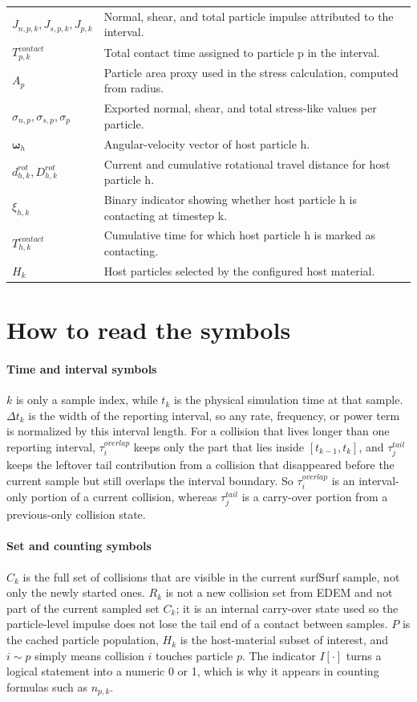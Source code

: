 \documentclass[11pt,a4paper]{article}
\begin{document}
\begin{longtable}{@{}L{0.22\textwidth}L{0.70\textwidth}@{}}
$J_{n,p,k}, J_{s,p,k}, J_{p,k}$ & Normal, shear, and total particle impulse attributed to the interval.\\
$T_{p,k}^{contact}$ & Total contact time assigned to particle p in the interval.\\
$A_p$ & Particle area proxy used in the stress calculation, computed from radius.\\
$\sigma_{n,p}, \sigma_{s,p}, \sigma_p$ & Exported normal, shear, and total stress-like values per particle.\\
$\boldsymbol{\omega}_h$ & Angular-velocity vector of host particle h.\\
$d_{h,k}^{rot}, D_{h,k}^{rot}$ & Current and cumulative rotational travel distance for host particle h.\\
$\xi_{h,k}$ & Binary indicator showing whether host particle h is contacting at timestep k.\\
$T_{h,k}^{contact}$ & Cumulative time for which host particle h is marked as contacting.\\
$H_k$ & Host particles selected by the configured host material.\\
\bottomrule
\end{longtable}

\section*{How to read the symbols}
\paragraph{Time and interval symbols}
$k$ is only a sample index, while $t_k$ is the physical simulation time at that sample.
$\Delta t_k$ is the width of the reporting interval, so any rate, frequency, or power term is normalized by this interval length.
For a collision that lives longer than one reporting interval, $\tau_i^{overlap}$ keeps only the part that lies inside $[t_{k-1}, t_k]$, and $\tau_j^{tail}$ keeps the leftover tail contribution from a collision that disappeared before the current sample but still overlaps the interval boundary.
So $\tau_i^{overlap}$ is an interval-only portion of a current collision, whereas $\tau_j^{tail}$ is a carry-over portion from a previous-only collision state.

\paragraph{Set and counting symbols}
$C_k$ is the full set of collisions that are visible in the current surfSurf sample, not only the newly started ones.
$R_k$ is not a new collision set from EDEM and not part of the current sampled set $C_k$; it is an internal carry-over state used so the particle-level impulse does not lose the tail end of a contact between samples.
$P$ is the cached particle population, $H_k$ is the host-material subset of interest, and $i \sim p$ simply means collision $i$ touches particle $p$.
The indicator $I[\cdot]$ turns a logical statement into a numeric 0 or 1, which is why it appears in counting formulas such as $n_{p,k}$.
\end{document}
